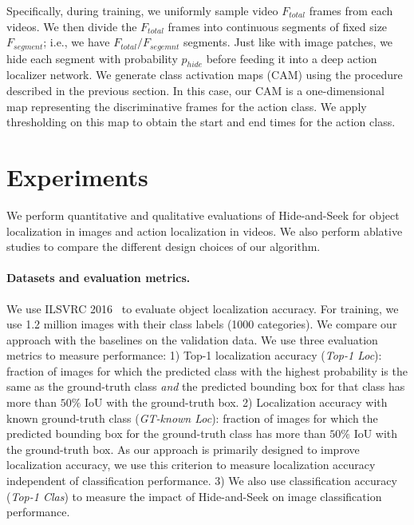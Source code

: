 \documentclass[10pt,twocolumn,letterpaper]{article}
\begin{document}
Specifically, during training, we uniformly sample video $F_{total}$ frames from each videos. We then divide the $F_{total}$ frames into continuous segments of fixed size $F_{segment}$; i.e., we have $F_{total} / F_{segemnt}$ segments. Just like with image patches, we hide each segment with probability $p_{hide}$ before feeding it into a deep action localizer network.  We generate class activation maps (CAM) using the procedure described in the previous section.  In this case, our CAM is a one-dimensional map representing the discriminative frames for the action class. We apply thresholding on this map to obtain the start and end times for the action class.


\section{Experiments}\label{section:results}

We perform quantitative and qualitative evaluations of Hide-and-Seek for object localization in images and action localization in videos.  We also perform ablative studies to compare the different design choices of our algorithm.

\vspace{-10pt}\paragraph{Datasets and evaluation metrics.} We use ILSVRC 2016~\cite{Russakovsky-IJCV2015} to evaluate object localization accuracy. For training, we use 1.2 million images with their class labels (1000 categories). We compare our approach with the baselines on the validation data. We use three evaluation metrics to measure performance: 1) Top-1 localization accuracy (\emph{Top-1 Loc}): fraction of images for which the predicted class with the highest probability is the same as the ground-truth class \emph{and} the predicted bounding box for that class has more than $50\%$ IoU with the ground-truth box. 2) Localization accuracy with known ground-truth class (\emph{GT-known Loc}): fraction of images for which the predicted bounding box for the ground-truth class has more than $50\%$ IoU with the ground-truth box.  As our approach is primarily designed to improve localization accuracy, we use this criterion to measure localization accuracy independent of classification performance. 3) We also use classification accuracy (\emph{Top-1 Clas}) to measure the impact of Hide-and-Seek on image classification performance.
\end{document}
